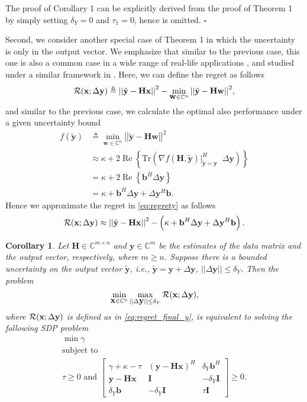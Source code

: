 \documentclass[review,sort&compress]{elsarticle}
\newtheorem{cor}{Corollary}
\renewcommand{\vec}[1]{\mbox{$\mathbf{#1}$}}
\newcommand{\norm}[1]{\left|\left|#1\right|\right|}
\newcommand{\defi}{\triangleq}
\newcommand{\tr}{\mathrm{Tr}}
\newcommand{\nn}{\nonumber}
\newcommand{\C}{\mathbb{C}}
\newcommand{\R}{{\cal R}}
\newcommand{\vH}{\vec{H}}
\newcommand{\vx}{\vec{x}}
\newcommand{\vy}{\vec{y}}
\newcommand{\dy}{\Delta\vy}
\newcommand{\ty}{\tilde{\vec{y}}}
\newcommand{\vI}{\vec{I}}
\newcommand{\vb}{\vec{b}}
\newcommand{\vw}{\vec{w}}
\begin{document}
\begin{poc1}
The proof of Corollary 1 can be explicitly derived from the proof of Theorem 1 by simply setting $\delta_Y = 0$ and $\tau_1 = 0$, hence is omitted. \hfill $\square$
\end{poc1}

Second, we consider another special case of Theorem 1 in which the uncertainty is only in the output vector. We emphasize that similar to the previous case, this one is also a common case in a wide range of real-life applications \cite{sayedbook}, and studied under a similar framework in \cite{yonina1}. Here, we can define the regret as follows
\begin{equation}\label{eq:regrety}
  \R(\vx; \dy) \defi {\norm{\ty - \vH \vx}}^2 - \min_{\vw \in \C^n}{\norm{\ty - \vH \vw}}^2,
\end{equation}
and similar to the previous case, we calculate the optimal also performance under a given uncertainty bound
\begin{align}
  f(\ty) & \defi \min_{\vw \in \C^n}{\norm{\ty - \vH \vw}}^2 \nn\\
         & \approx \kappa + 2\operatorname{Re} \left\{ \tr\left( \nabla f(\vH, \ty)\big\vert_{\ty=\vy}^H \;\; \dy \right) \right\} \nn\\
         & = \kappa + 2\operatorname{Re}\left\{ \vb^H \dy \right\} \nn\\
         & = \kappa + \vb^H \dy + \dy^H \vb. \nn
\end{align}
Hence we approximate the regret in \eqref{eq:regrety} as follows
\begin{equation}\label{eq:regret_final_y}
\R(\vx; \dy) \approx {\norm{\ty - \vH \vx}}^2 - \left( \kappa + \vb^H \dy + \dy^H \vb \right).
\end{equation}

\begin{cor}\label{cor2}
Let $\vH \in \C^{m\times n}$ and $\vy \in \C^{m}$ be the estimates of the data matrix and the output vector, respectively, where $m \geq n$. Suppose there is a bounded uncertainty on the output vector $\ty$, i.e., $\ty=\vy+\dy$, $\norm{\dy} \leq \delta_Y$. Then the problem
\begin{equation}
\min_{\vx \in \C^n} \max_{\norm{\dy} \leq \delta_Y} \R(\vx; \dy),
\end{equation}
where $\R(\vx; \dy)$ is defined as in \eqref{eq:regret_final_y}, is equivalent to solving the following SDP problem
\begin{gather}
\min \gamma \nn\\
\mbox{subject to} \nn\\
\tau \geq 0 \text{ and }
\begin{bmatrix}
\gamma + \kappa -\tau  & (\vy-\vH\vx)^H  & \delta_Y\vb^H \\
\vy-\vH\vx             & \vI             & -\delta_Y\vI \\
\delta_Y\vb            & -\delta_Y\vI    & \tau \vI
\end{bmatrix} \geq 0.
\end{gather}
\end{cor}
\end{document}
